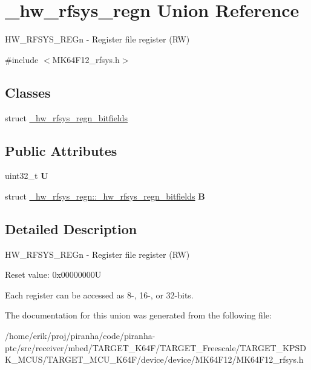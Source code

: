 \hypertarget{union__hw__rfsys__regn}{}\section{\+\_\+hw\+\_\+rfsys\+\_\+regn Union Reference}
\label{union__hw__rfsys__regn}


H\+W\+\_\+\+R\+F\+S\+Y\+S\+\_\+\+R\+E\+Gn -\/ Register file register (RW)  




{\ttfamily \#include $<$M\+K64\+F12\+\_\+rfsys.\+h$>$}

\subsection*{Classes}
\begin{DoxyCompactItemize}
\item 
struct \hyperlink{struct__hw__rfsys__regn_1_1__hw__rfsys__regn__bitfields}{\+\_\+hw\+\_\+rfsys\+\_\+regn\+\_\+bitfields}
\end{DoxyCompactItemize}
\subsection*{Public Attributes}
\begin{DoxyCompactItemize}
\item 
uint32\+\_\+t {\bfseries U}\hypertarget{union__hw__rfsys__regn_a4112ecc1260add395f72b50ae9e79b64}{}\label{union__hw__rfsys__regn_a4112ecc1260add395f72b50ae9e79b64}

\item 
struct \hyperlink{struct__hw__rfsys__regn_1_1__hw__rfsys__regn__bitfields}{\+\_\+hw\+\_\+rfsys\+\_\+regn\+::\+\_\+hw\+\_\+rfsys\+\_\+regn\+\_\+bitfields} {\bfseries B}\hypertarget{union__hw__rfsys__regn_a184759f12cbe9d7bee56ec4ea0df5a99}{}\label{union__hw__rfsys__regn_a184759f12cbe9d7bee56ec4ea0df5a99}

\end{DoxyCompactItemize}


\subsection{Detailed Description}
H\+W\+\_\+\+R\+F\+S\+Y\+S\+\_\+\+R\+E\+Gn -\/ Register file register (RW) 

Reset value\+: 0x00000000U

Each register can be accessed as 8-\/, 16-\/, or 32-\/bits. 

The documentation for this union was generated from the following file\+:\begin{DoxyCompactItemize}
\item 
/home/erik/proj/piranha/code/piranha-\/ptc/src/receiver/mbed/\+T\+A\+R\+G\+E\+T\+\_\+\+K64\+F/\+T\+A\+R\+G\+E\+T\+\_\+\+Freescale/\+T\+A\+R\+G\+E\+T\+\_\+\+K\+P\+S\+D\+K\+\_\+\+M\+C\+U\+S/\+T\+A\+R\+G\+E\+T\+\_\+\+M\+C\+U\+\_\+\+K64\+F/device/device/\+M\+K64\+F12/M\+K64\+F12\+\_\+rfsys.\+h\end{DoxyCompactItemize}
